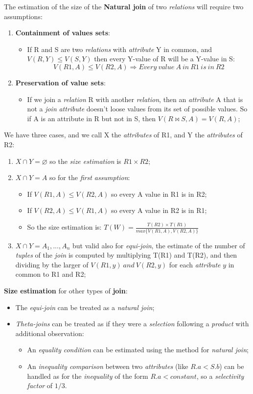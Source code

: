 \documentclass{article}
\begin{document}
\clearpage
The estimation of the size of the \textbf{Natural join} of two \emph{relations} will require two assumptions:
\begin{enumerate}
\item \textbf{Containment of values sets}:
\begin{itemize}
\item If R and S are two \emph{relations} with \emph{attribute} Y in common, and $V(R,Y) \leq V(S,Y)$ then every Y-value of R will be a Y-value in S:
\[V(R1,A) \leq V(R2,A) \Rightarrow Every\ value\ A\ in\ R1\ is\ in\ R2\]
\end{itemize}
\item \textbf{Preservation of value sets}:
\begin{itemize}
\item If we join a \emph{relation} R with another \emph{relation}, then an \emph{attribute} A that is not a \emph{join} \emph{attribute} doesn't loose values from its set of possible values. So if A is an attribute in R but not in S, then $V(R \bowtie S, A) = V(R,A)$;
\end{itemize}
\end{enumerate}
We have three cases, and we call X the \emph{attributes} of R1, and Y the \emph{attributes} of R2:
\begin{enumerate}
\item $X \cap Y = \varnothing$ so the \emph{size estimation} is $R1 \times R2$;
\item $X \cap Y = A$ so for the \emph{first assumption}:
\begin{itemize}
\item If $V(R1,A) \leq V(R2,A)$ so every A value in R1 is in R2;
\item If $V(R2,A) \leq V(R1,A)$ so every A value in R2 is in R1;
\item So the size estimation is: $T(W) = \frac{T(R2) \times T(R1)}{max\{V(R1,A),V(R2,A)\}}$
\end{itemize}
\item $X \cap Y = A_1, ... , A_n$ but valid also for \emph{equi-join}, the estimate of the number of \emph{tuples} of the \emph{join} is computed by multiplying T(R1) and T(R2), and then dividing by the larger of $V(R1,y)\ and\ V(R2,y)$ for each \emph{attribute} $y$ in common to R1 and R2;
\end{enumerate}
\textbf{Size estimation} for other types of \textbf{join}:
\begin{itemize}
\item The \emph{equi-join} can be treated as a \emph{natural join};
\item \emph{Theta-joins} can be treated as if they were a \emph{selection} following a \emph{product} with additional observation:
\begin{itemize}
\item An \emph{equality condition} can be estimated using the method for \emph{natural join};
\item An \emph{inequality comparison} between two \emph{attributes} (like $R.a < S.b$) can be handled as for the \emph{inequality} of the form $R.a < constant$, so a \emph{selectivity factor} of $1/3$.
\end{itemize}
\end{itemize}
\end{document}
